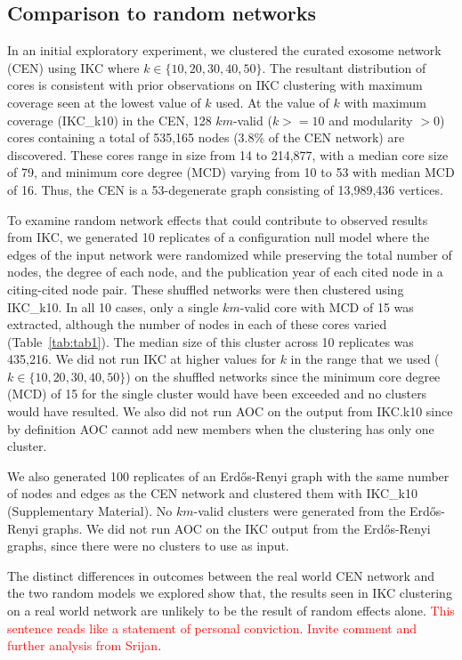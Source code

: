 \documentclass[12pt, oneside]{article}   	%
\begin{document}
\subsection{Comparison to random networks} In an initial exploratory experiment, we clustered the curated exosome network (CEN) using IKC where $k \in {\{10,20,30,40, 50\}}$. 
The resultant distribution of cores is consistent with prior observations on IKC clustering \citep[Figure 3]{Wedell2022} with maximum coverage seen at the lowest value of $k$ used. At the value of $k$ with maximum coverage (IKC\_k10) in the CEN, 128 $km$-valid ($k >=10$ and modularity $> 0$) cores containing a total of 535,165 nodes (3.8\% of the CEN network) are discovered. These cores range in size from 14 to 214,877, with a median core size of 79, and minimum core degree (MCD) varying from 10 to 53 with median MCD of 16. Thus, the CEN is a 53-degenerate graph consisting of 13,989,436 vertices.
 
To examine random network effects that could contribute to observed results from IKC, we generated 10 replicates of a configuration null model where the edges of the input network were randomized while preserving the total number of nodes, the degree of each node,  and the publication year of each cited node in a citing-cited node pair. These shuffled networks were then clustered using IKC\_k10. In all 10 cases, only a single $km$-valid core with MCD of 15 was extracted, although the number of nodes in each of these cores varied (Table~\ref{tab:tab1}). The median size of this cluster across 10 replicates was 435,216. We did not run IKC at higher values for $k$ in the range that we used ($k \in {\{10,20,30,40, 50\}}$) on the shuffled networks since  the minimum core degree (MCD) of 15 for the single cluster would have been exceeded and no clusters would have resulted.
We also did not run AOC on the output from IKC.k10 since by definition AOC cannot add new members when the clustering has only one cluster. 
 

We also generated 100 replicates of an Erd\H{o}s-Renyi graph with the same number of nodes and edges as the CEN network and clustered them with IKC\_k10 (Supplementary Material). No $km$-valid clusters were generated from the Erd\H{o}s-Renyi graphs. We did not run AOC on the IKC output from  the Erd\H{o}s-Renyi graphs, since there were no clusters to use as input. 


The distinct differences in outcomes between the real world CEN network and the two random models we explored show that, the results seen in IKC clustering on a real world network are unlikely to be the result of random effects alone. \textcolor{red}{This sentence reads like a statement of personal conviction. Invite comment and further analysis from Srijan}.
\end{document}
